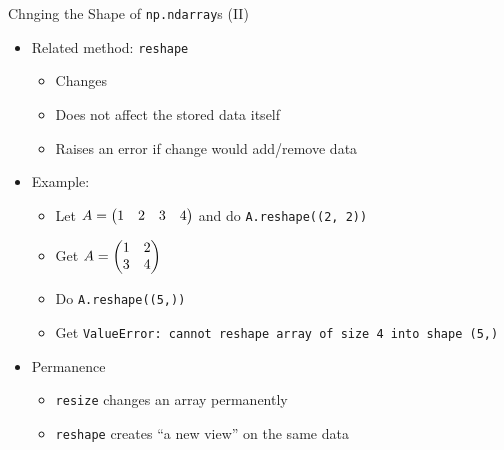 \begin{frame}[fragile]{Chnging the Shape of \texttt{np.ndarray}s (II)}
%
\begin{itemize}
\item Related method: \texttt{reshape}
	\begin{itemize}
	\item Changes 
	\item Does not affect the stored data itself
	\item Raises an error if change would add/remove data
	\end{itemize}
\item Example:
	\begin{itemize}
	\item Let $\displaystyle A = \mqty(1 & 2 & 3 & 4)$ and do \texttt{A.reshape((2, 2))}
	\item Get $\displaystyle A = \mqty(1 & 2 \\ 3 & 4)$
	\item Do \texttt{A.reshape((5,))}
	\item Get \texttt{ValueError: cannot reshape array of size 4 into shape (5,)}
	\end{itemize}
\item Permanence
	\begin{itemize}
	\item \texttt{resize} changes an array permanently
	\item \texttt{reshape} creates \enquote{a new view} on the same data
	\end{itemize}
\end{itemize}
%
\end{frame}


